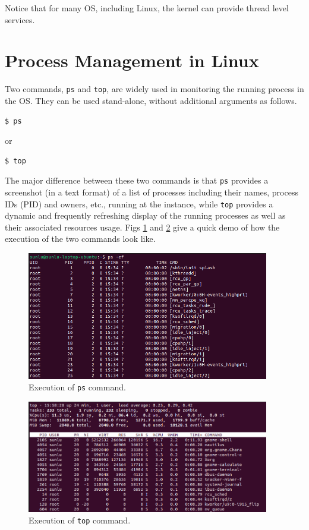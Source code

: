 Notice that for many OS, including Linux, the kernel can provide thread level services.

\section{Process Management in Linux}

Two commands, \verb|ps| and \verb|top|, are widely used in monitoring the running process in the OS. They can be used stand-alone, without additional arguments as follows.
\begin{lstlisting}
$ ps
\end{lstlisting}
or
\begin{lstlisting}
$ top
\end{lstlisting}

The major difference between these two commands is that \verb|ps| provides a screenshot (in a text format) of a list of processes including their names, process IDs (PID) and owners, etc., running at the instance, while \verb|top| provides a dynamic and frequently refreshing display of the running processes as well as their associated resources usage. Figs \ref{ch:pm:fig:pscommand} and \ref{ch:pm:fig:topcommand} give a quick demo of how the execution of the two commands look like.

\begin{figure}[htbp]
	\centering
	\includegraphics[width=300pt]{chapters/part-1/figures/pscommand.png}
	\caption{Execution of \texttt{ps} command.} \label{ch:pm:fig:pscommand}
\end{figure}

\begin{figure}[htbp]
	\centering
	\includegraphics[width=300pt]{chapters/part-1/figures/topcommand.png}
	\caption{Execution of \texttt{top} command.} \label{ch:pm:fig:topcommand}
\end{figure}

